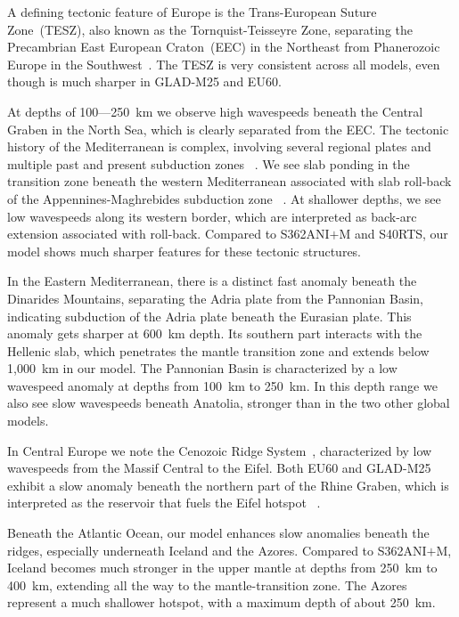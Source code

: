 \documentclass[extra,mreferee]{gji}
\begin{document}
A defining tectonic feature of Europe is the Trans-European Suture Zone~(TESZ),
also known as the Tornquist-Teisseyre Zone,
separating the Precambrian East European Craton~(EEC) in the Northeast from
Phanerozoic Europe in the Southwest~\citep{zielhuis1994deep}.
The TESZ is very consistent across all models,
even though is much sharper in GLAD-M25 and EU60.

At depths of 100---250~km we observe high wavespeeds beneath the Central Graben
in the North Sea, which is clearly separated from the EEC.
The tectonic history of the Mediterranean is complex,
involving several regional plates and multiple past and present subduction zones
~\citep{dewey1989kinematics}.
We see slab ponding in the transition zone beneath the western Mediterranean
associated with slab roll-back of the Appennines-Maghrebides subduction zone
~\citep{wortel2000subduction, zhu2012structure}.
At shallower depths, we see low wavespeeds along its western border,
which are interpreted as back-arc extension associated with  roll-back.
Compared to S362ANI$+$M and S40RTS,
our model shows much sharper features for these tectonic structures.

In the Eastern Mediterranean, there is a distinct fast anomaly beneath the 
Dinarides Mountains, separating the Adria plate from the Pannonian Basin,
indicating subduction of the Adria plate beneath the Eurasian plate.
This anomaly gets sharper at 600~km depth.
Its southern part interacts with the Hellenic slab, which penetrates the mantle
transition zone and extends below 1,000~km in our model.
The Pannonian Basin is characterized by a low wavespeed
anomaly at depths from 100~km to 250~km.
In this depth range we also see slow wavespeeds beneath Anatolia,
stronger than in the two other global models.

In Central Europe we note the Cenozoic Ridge System~\citep{ziegler1992european},
characterized by low 
wavespeeds from the Massif Central to the Eifel. Both EU60 and
GLAD-M25 exhibit a slow anomaly beneath the northern part of the Rhine Graben,
which is interpreted as the reservoir that fuels the Eifel hotspot
~\citep{goes1999lower, zhu2015seismic}.

Beneath the Atlantic Ocean, our model enhances slow anomalies beneath the
ridges, especially underneath Iceland and the Azores.
Compared to S362ANI$+$M, Iceland becomes much stronger in the upper mantle at
depths from 250~km to 400~km, extending all the way to the mantle-transition zone.
The Azores represent a much shallower hotspot, with a maximum depth of about 250~km.
\end{document}
